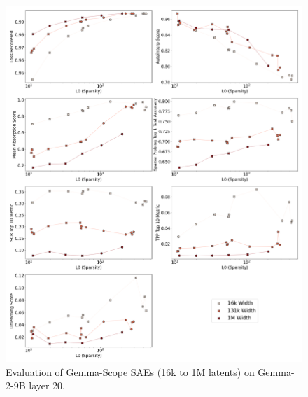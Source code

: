\documentclass{article}
\theoremstyle{plain}
\theoremstyle{definition}
\theoremstyle{remark}
\begin{document}
\begin{figure}[h!]
    \centering
    \includegraphics[width=\columnwidth]{images/gemma-scope/plot_2x4_gemma-scope_gemma-2-9b_width_series_layer_20.png}
    \caption{Evaluation of Gemma-Scope SAEs (16k to 1M latents) on Gemma-2-9B layer 20.}
\end{figure}
\end{document}
